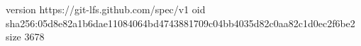 version https://git-lfs.github.com/spec/v1
oid sha256:05d8e82a1b6dae11084064bd4743881709c04bb4035d82c0aa82c1d0ec2f6be2
size 3678
